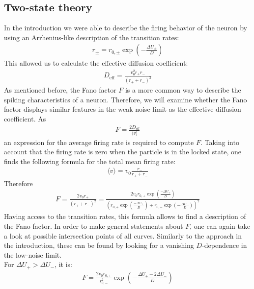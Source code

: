 \documentclass[12pt,a4paper]{article}
\begin{document}
\subsection{Two-state theory}\label{tst}
In the introduction we were able to describe the firing behavior of the neuron by using an Arrhenius-like description of the transition rates:
\begin{align*}
r_{\pm}=r_{0,\pm}\exp\left(-\frac{\Delta U_{\pm}}{D}\right)
\end{align*}
This allowed us to calculate the effective diffusion coefficient:
\begin{align*}
D_{\text{eff}}=\frac{v_0^2 r_+r_-}{(r_++r_-)^3}
\end{align*}
As mentioned before, the Fano factor $F$ is a more common way to describe the spiking characteristics of a neuron. Therefore, we will examine whether the Fano factor displays similar features in the weak noise limit as the effective diffusion coefficient. As 
\begin{align*}
F=\frac{2D_{\text{eff}}}{\langle v\rangle}
\end{align*}
an expression for the average firing rate is required to compute $F$. Taking into account that the firing rate is zero when the particle is in the locked state, one finds the following formula for the total mean firing rate:
\begin{align*}
\langle v\rangle=v_0\frac{r_-}{r_++r_-}
\end{align*}
Therefore
\begin{align*}
F=\frac{2v_0r_+}{(r_++r_-)^2}=\frac{2v_0r_{0,+}\exp\left(\frac{-\Delta U_+}{D}\right)}{\left(r_{0,+}\exp\left(\frac{-\Delta U_+}{D}\right)+r_{0,-}\exp\left(-\frac{\Delta U_-}{D}\right)\right)^2}
\end{align*}
Having access to the transition rates, this formula allows to find a description of the Fano factor. In order to make general statements about $F$, one can again take a look at possible intersection points of all curves. Similarly to the approach in the introduction, these can be found by looking for a vanishing $D$-dependence in the low-noise limit.\\
For $\Delta U_+ > \Delta U_-$, it is:
\begin{align*}
F=\frac{2v_0r_{0,+}}{r_{0,-}^2}\exp\left(-\frac{\Delta U_+-2\Delta U_-}{D}\right) 
\end{align*}
\end{document}
